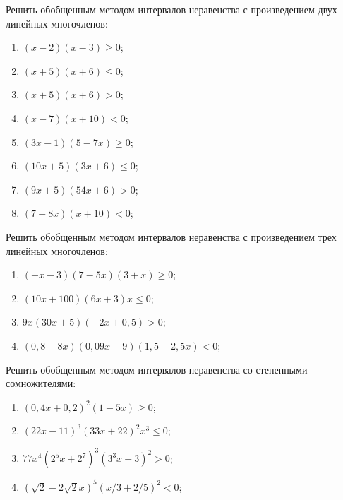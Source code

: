 \documentclass[algebra,a4paper]{pum}
\begin{document}
\begin{exercises}
  \begin{multicols}{2}
    
\begin{question}
  Решить обобщенным методом интервалов неравенства с произведением двух линейных многочленов:
\begin{multicols}{2}
\begin{enumerate}
  \item $(x-2)(x-3)\ge0$;
  \item $(x+5)(x+6)\le0$;
  \item $(x+5)(x+6)>0$;
  \item $(x-7)(x+10)<0$;
  \item $(3x-1)(5-7x)\ge0$;
  \item $(10x+5)(3x+6)\le0$;
  \item $(9x+5)(54x+6)>0$;
  \item $(7-8x)(x+10)<0$;
\end{enumerate}
\end{multicols}
\end{question}

\begin{question}
  Решить обобщенным методом интервалов неравенства с произведением трех линейных многочленов:
\begin{enumerate}
  \item $(-x-3)(7-5x)(3+x)\ge0$;
  \item $(10x+100)(6x+3)x\le0$;
  \item $9x(30x+5)(-2x+0,5)>0$;
  \item $(0,8-8x)(0,09x+9)(1,5-2,5x)<0$;
\end{enumerate}
\end{question}

\begin{question}
  Решить обобщенным методом интервалов неравенства со степенными сомножителями:
\begin{enumerate}
  \item $(0,4x+0,2)^2(1-5x)\ge0$;
  \item $(22x-11)^3(33x+22)^2 x^3\le0$;
  \item $77x^4(2^5x+2^7)^3(3^3x-3)^2>0$;
  \item $(\sqrt{2}-2\sqrt{2}x)^5 (x/3+2/5)^2<0$;
\end{enumerate}
\end{question}


\end{multicols}
\end{exercises}
\end{document}
